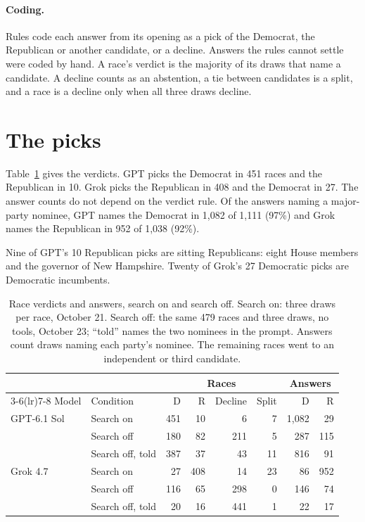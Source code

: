 \documentclass[11pt]{article}
\begin{document}
\paragraph{Coding.} Rules code each answer from its opening as a pick of the Democrat, the
Republican or another candidate, or a decline. Answers the rules cannot settle were coded by hand. A race's
verdict is the majority of its draws that name a candidate. A decline counts as an abstention, a
tie between candidates is a split, and a race is a decline only when all three draws decline.

\section{The picks}
\label{sec:picks}

Table~\ref{tab:picks} gives the verdicts. GPT picks the Democrat in 451 races and the Republican
in 10. Grok picks the Republican in 408 and the Democrat in 27. The answer counts do not depend on
the verdict rule. Of the answers naming a major-party nominee, GPT names the Democrat in 1,082 of
1,111 (97\%) and Grok names the Republican in 952 of 1,038 (92\%).

Nine of GPT's 10 Republican picks are sitting Republicans: eight House members and the governor
of New Hampshire. Twenty of Grok's 27 Democratic picks are
Democratic incumbents.

\begin{table}[!htbp]
\centering
\caption{Race verdicts and answers, search on and search off. Search on: three draws per race,
October 21. Search off: the same 479 races and three draws, no tools, October 23; ``told'' names
the two nominees in the prompt. Answers count draws naming each party's nominee. The remaining races
went to an independent or third candidate.}
\label{tab:picks}
\small
\begin{tabular}{llrrrrrr}
\toprule
& & \multicolumn{4}{c}{Races} & \multicolumn{2}{c}{Answers} \\
\cmidrule(lr){3-6}\cmidrule(lr){7-8}
Model & Condition & D & R & Decline & Split & D & R \\
\midrule
GPT-6.1 Sol & Search on & 451 & 10 & 6 & 7 & 1,082 & 29 \\
 & Search off & 180 & 82 & 211 & 5 & 287 & 115 \\
 & Search off, told & 387 & 37 & 43 & 11 & 816 & 91 \\
\midrule
Grok 4.7 & Search on & 27 & 408 & 14 & 23 & 86 & 952 \\
 & Search off & 116 & 65 & 298 & 0 & 146 & 74 \\
 & Search off, told & 20 & 16 & 441 & 1 & 22 & 17 \\
\bottomrule
\end{tabular}
\end{table}
\end{document}
